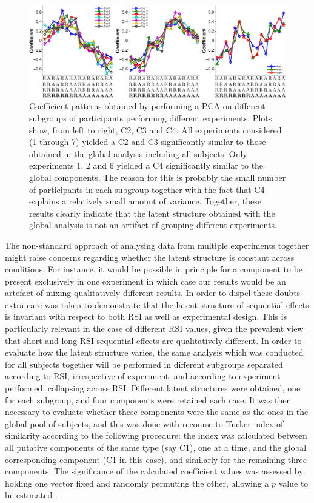 \documentclass[12pt,letterpaper]{article}
\begin{document}
\begin{figure}[t]
\centering
\includegraphics[width=1\textwidth]{components_exp.pdf}
\caption[Latent structure per experiment]{Coefficient patterns obtained by performing a PCA on different subgroups of participants performing different experiments. Plots show, from left to right, C2, C3 and C4. All experiments considered (1 through 7) yielded a C2 and C3 significantly similar to those obtained in the global analysis including all subjects. Only experiments 1, 2 and 6 yielded a C4 significantly similar to the global components. The reason for this is probably the small number of participants in each subgroup together with the fact that C4 explains a relatively small amount of variance. Together, these results clearly indicate that the latent structure obtained with the global analysis is not an artifact of grouping different experiments. }\label{components_exp}
\end{figure}

The non-standard approach of analysing data from multiple experiments together might raise concerns regarding whether the latent structure is constant across conditions. For instance, it would be possible in principle for a component to be present exclusively in one experiment in which case our results would be an artefact of mixing qualitatively different results. In order to dispel these doubts extra care was taken to demonstrate that the latent structure of sequential effects is invariant with respect to both RSI as well as experimental design. This is particularly relevant in the case of different RSI values, given the prevalent view that short and long RSI sequential effects are qualitatively different. In order to evaluate how the latent structure varies, the same analysis which was conducted for all subjects together will be performed in different subgroups separated according to RSI, irrespective of experiment, and according to experiment performed, collapsing across RSI. Different latent structures were obtained, one for each subgroup, and four components were retained each case. It was then necessary to evaluate whether these components were the same as the ones in the global pool of subjects, and this was done with recourse to Tucker index of similarity \cite{Gorsuch83} according to the following procedure: the index was calculated between all putative components of the same type (say C1), one at a time, and the global corresponding component (C1 in this case), and similarly for the remaining three components. The significance of the calculated coefficient values was assessed by holding one vector fixed and randomly permuting the other, allowing a $p$ value to be estimated \cite{Abdi07}. 
\end{document}
